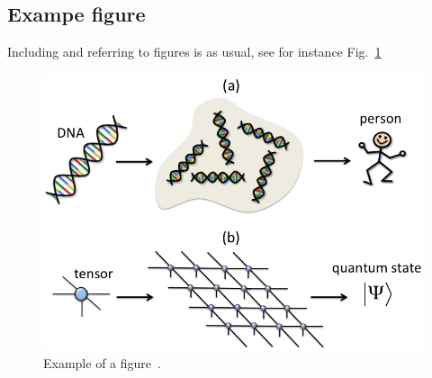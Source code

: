 \documentclass[reprint,amsmath,amssymb,aps,prb]{revtex4-2}
\begin{document}
\subsection{Exampe figure}
Including and referring to figures is as usual, see for instance Fig.~\ref{fig:example}
\begin{figure}
\includegraphics[width=0.99\linewidth]{cartoon.png}
\caption{Example of a figure~\cite{Orus2013}.}
\label{fig:example}
\end{figure}



\appendix
\end{document}
